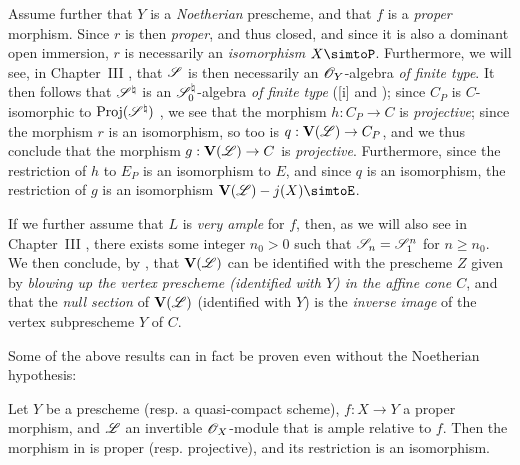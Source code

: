 \begin{remark}[8.8.3]
\label{II.8.8.3}
Assume further that $Y$ is a \emph{Noetherian} prescheme, and that $f$ is a \emph{proper} morphism.
Since $r$ is then \emph{proper}, and thus closed, and since it is also a dominant open immersion, $r$ is necessarily an \emph{isomorphism} $X\simtoP$.
Furthermore, we will see, in Chapter~III , that $\mathscr{S}$ is then necessarily an $\mathscr{O}_Y$-algebra \emph{of finite type}.
It then follows that $\mathscr{S}^\natural$ is an $\mathscr{S}_0^\natural$-algebra \emph{of finite type} ([i] and );
since $C_P$ is $C$-isomorphic to $\operatorname{Proj}(\mathscr{S}^\natural)$ , we see that the morphism $h:C_P\to C$ is \emph{projective};
since the morphism $r$ is an isomorphism, so too is $q:\bb{V}(\sh{L})\to C_P$, and we thus conclude that the morphism $g:\bb{V}(\sh{L})\to C$ is \emph{projective}.
Furthermore, since the restriction of $h$ to $E_P$ is an isomorphism to $E$, and since $q$ is an isomorphism, the restriction  of $g$ is an isomorphism $\bb{V}(\sh{L})\setmin j(X)\simtoE$.

If we further assume that $L$ is \emph{very ample} for $f$, then, as we will also see in Chapter~III , there exists some integer $n_0>0$ such that $\mathscr{S}_n=\mathscr{S}_1^n$ for $n\geq n_0$.
We then conclude, by , that $\mathbf{V}(\mathscr{L})$ can be identified with the prescheme $Z$ given by \emph{blowing up the vertex prescheme \emph{(identified with $Y$)} in the affine cone $C$}, and that the \emph{null section} of $\mathbf{V}(\mathscr{L})$ (identified with $Y$) is the \emph{inverse image} of the vertex subprescheme $Y$ of $C$.

Some of the above results can in fact be proven even without the Noetherian hypothesis:
\end{remark}
\begin{corollary}[8.8.4]
\label{II.8.8.4}
Let $Y$ be a prescheme (resp. a quasi-compact scheme), $f:X\to Y$ a proper morphism, and $\mathscr{L}$ an invertible $\mathscr{O}_X$-module that is ample relative to $f$.
Then the morphism in  is proper (resp. projective), and its restriction  is an isomorphism.
\end{corollary}

